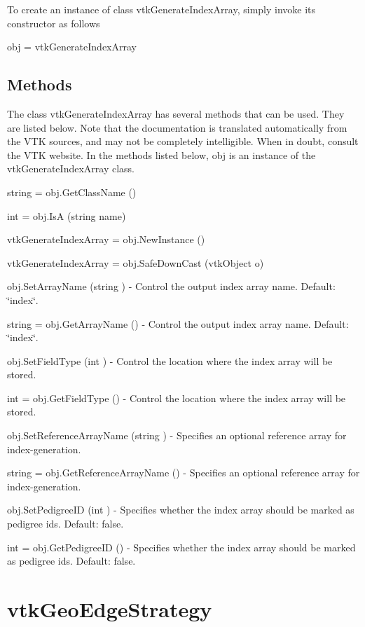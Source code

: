 To create an instance of class vtk\-Generate\-Index\-Array, simply invoke its constructor as follows \begin{DoxyVerb}  obj = vtkGenerateIndexArray
\end{DoxyVerb}
 \hypertarget{vtkwidgets_vtkxyplotwidget_Methods}{}\subsection{Methods}\label{vtkwidgets_vtkxyplotwidget_Methods}
The class vtk\-Generate\-Index\-Array has several methods that can be used. They are listed below. Note that the documentation is translated automatically from the V\-T\-K sources, and may not be completely intelligible. When in doubt, consult the V\-T\-K website. In the methods listed below, {\ttfamily obj} is an instance of the vtk\-Generate\-Index\-Array class. 
\begin{DoxyItemize}
\item {\ttfamily string = obj.\-Get\-Class\-Name ()}  
\item {\ttfamily int = obj.\-Is\-A (string name)}  
\item {\ttfamily vtk\-Generate\-Index\-Array = obj.\-New\-Instance ()}  
\item {\ttfamily vtk\-Generate\-Index\-Array = obj.\-Safe\-Down\-Cast (vtk\-Object o)}  
\item {\ttfamily obj.\-Set\-Array\-Name (string )} -\/ Control the output index array name. Default\-: \char`\"{}index\char`\"{}.  
\item {\ttfamily string = obj.\-Get\-Array\-Name ()} -\/ Control the output index array name. Default\-: \char`\"{}index\char`\"{}.  
\item {\ttfamily obj.\-Set\-Field\-Type (int )} -\/ Control the location where the index array will be stored.  
\item {\ttfamily int = obj.\-Get\-Field\-Type ()} -\/ Control the location where the index array will be stored.  
\item {\ttfamily obj.\-Set\-Reference\-Array\-Name (string )} -\/ Specifies an optional reference array for index-\/generation.  
\item {\ttfamily string = obj.\-Get\-Reference\-Array\-Name ()} -\/ Specifies an optional reference array for index-\/generation.  
\item {\ttfamily obj.\-Set\-Pedigree\-I\-D (int )} -\/ Specifies whether the index array should be marked as pedigree ids. Default\-: false.  
\item {\ttfamily int = obj.\-Get\-Pedigree\-I\-D ()} -\/ Specifies whether the index array should be marked as pedigree ids. Default\-: false.  
\end{DoxyItemize}\hypertarget{vtkinfovis_vtkgeoedgestrategy}{}\section{vtk\-Geo\-Edge\-Strategy}\label{vtkinfovis_vtkgeoedgestrategy}

